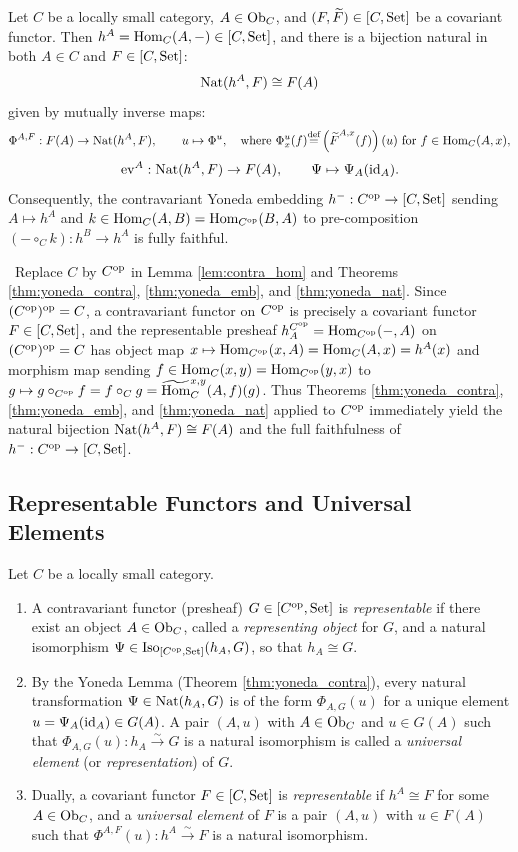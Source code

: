 \documentclass[10pt,a4paper]{article}
\begin{document}
\begin{theorem}\label{thm:yoneda_cov}
Let $C$ be a locally small category, $A \in {\textrm{Ob}}_C$, and $(F, {\widetilde{F}\textrm{}}) \in [C, {\textrm{Set}}]$ be a covariant functor. Then $h^A = {\textrm{Hom}}_C(A, -) \in [C, {\textrm{Set}}]$, and there is a bijection natural in both $A \in C$ and $F \in [C, {\textrm{Set}}]$:
$${\textrm{Nat}}(h^A, F) \cong F(A)$$
given by mutually inverse maps:
$$\Phi^{A,F} : F(A) \to {\textrm{Nat}}(h^A, F), \qquad u \mapsto \Phi^u, \quad \textrm{where } \Phi^u_x(f) {\stackrel{{\textrm{def}}}{=}} \left({\widetilde{F}\textrm{}}^{A,x}(f)\right)(u) \textrm{ for } f \in {\textrm{Hom}}_C(A,x),$$
$$\mathrm{ev}^A : {\textrm{Nat}}(h^A, F) \to F(A), \qquad \Psi \mapsto \Psi_A({\textrm{id}}_A).$$
Consequently, the contravariant Yoneda embedding $h^- : C^{\textrm{op}} \to [C, {\textrm{Set}}]$ sending $A \mapsto h^A$ and $k \in {\textrm{Hom}}_C(A,B) = {\textrm{Hom}}_{C^{\textrm{op}}}(B,A)$ to pre-composition $(- \circ_C k) : h^B \to h^A$ is fully faithful.
\end{theorem}
\myprf\ Replace $C$ by $C^{\textrm{op}}$ in Lemma \ref{lem:contra_hom} and Theorems \ref{thm:yoneda_contra}, \ref{thm:yoneda_emb}, and \ref{thm:yoneda_nat}. Since $(C^{\textrm{op}})^{\textrm{op}} = C$, a contravariant functor on $C^{\textrm{op}}$ is precisely a covariant functor $F \in [C, {\textrm{Set}}]$, and the representable presheaf $h_A^{C^{\textrm{op}}} = {\textrm{Hom}}_{C^{\textrm{op}}}(-, A)$ on $(C^{\textrm{op}})^{\textrm{op}} = C$ has object map $x \mapsto {\textrm{Hom}}_{C^{\textrm{op}}}(x, A) = {\textrm{Hom}}_C(A, x) = h^A(x)$ and morphism map sending $f \in {\textrm{Hom}}_C(x,y) = {\textrm{Hom}}_{C^{\textrm{op}}}(y,x)$ to $g \mapsto g \circ_{C^{\textrm{op}}} f = f \circ_C g = {\widetilde{{\textrm{Hom}}}\textrm{}}_C^{x,y}(A, f)(g)$. Thus Theorems \ref{thm:yoneda_contra}, \ref{thm:yoneda_emb}, and \ref{thm:yoneda_nat} applied to $C^{\textrm{op}}$ immediately yield the natural bijection ${\textrm{Nat}}(h^A, F) \cong F(A)$ and the full faithfulness of $h^- : C^{\textrm{op}} \to [C, {\textrm{Set}}]$. \myqed
\subsection{Representable Functors and Universal Elements}
\begin{definition}\label{def:representable}
Let $C$ be a locally small category.
\begin{enumerate}
\item A contravariant functor (presheaf) $G \in [C^{\textrm{op}}, {\textrm{Set}}]$ is \emph{representable} if there exist an object $A \in {\textrm{Ob}}_C$, called a \emph{representing object} for $G$, and a natural isomorphism $\Psi \in \mathrm{Iso}_{[C^{\textrm{op}}, {\textrm{Set}}]}(h_A, G)$, so that $h_A \cong G$.
\item By the Yoneda Lemma (Theorem \ref{thm:yoneda_contra}), every natural transformation $\Psi \in {\textrm{Nat}}(h_A, G)$ is of the form $\Phi_{A,G}(u)$ for a unique element $u = \Psi_A({\textrm{id}}_A) \in G(A)$. A pair $(A, u)$ with $A \in {\textrm{Ob}}_C$ and $u \in G(A)$ such that $\Phi_{A,G}(u) : h_A \xrightarrow{\sim} G$ is a natural isomorphism is called a \emph{universal element} (or \emph{representation}) of $G$.
\item Dually, a covariant functor $F \in [C, {\textrm{Set}}]$ is \emph{representable} if $h^A \cong F$ for some $A \in {\textrm{Ob}}_C$, and a \emph{universal element} of $F$ is a pair $(A, u)$ with $u \in F(A)$ such that $\Phi^{A,F}(u) : h^A \xrightarrow{\sim} F$ is a natural isomorphism.
\end{enumerate}
\end{definition}
\end{document}
